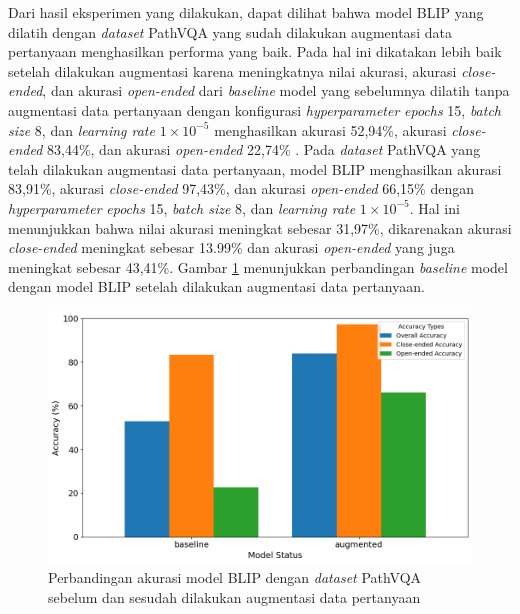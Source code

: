 \par Dari hasil eksperimen yang dilakukan, dapat dilihat bahwa model BLIP yang dilatih dengan \textit{dataset} PathVQA yang sudah dilakukan augmentasi data pertanyaan menghasilkan performa yang baik. Pada hal ini dikatakan lebih baik setelah dilakukan augmentasi karena meningkatnya nilai akurasi, akurasi \textit{close-ended}, dan akurasi \textit{open-ended} dari \textit{baseline} model yang sebelumnya dilatih tanpa augmentasi data pertanyaan dengan konfigurasi \textit{hyperparameter} \textit{epochs} 15, \textit{batch size} 8, dan \textit{learning rate} $1 \times 10^{-5}$ menghasilkan akurasi 52,94\%, akurasi \textit{close-ended} 83,44\%, dan akurasi \textit{open-ended} 22,74\% . Pada \textit{dataset} PathVQA yang telah dilakukan augmentasi data pertanyaan, model BLIP menghasilkan akurasi 83,91\%, akurasi \textit{close-ended} 97,43\%, dan akurasi \textit{open-ended} 66,15\% dengan \textit{hyperparameter} \textit{epochs} 15, \textit{batch size} 8, dan \textit{learning rate} $1 \times 10^{-5}$. Hal ini menunjukkan bahwa nilai akurasi meningkat sebesar 31,97\%, dikarenakan akurasi \textit{close-ended} meningkat sebesar 13.99\% dan akurasi \textit{open-ended} yang juga meningkat sebesar 43,41\%. Gambar \ref{fig:perbandingan-akurasi-blip-pathvqa} menunjukkan perbandingan \textit{baseline} model dengan model BLIP setelah dilakukan augmentasi data pertanyaan.

\begin{figure}[H]
  \centering
  \includegraphics[width=\textwidth]{image/bab4/blip-pathvqa.png}
  \caption{Perbandingan akurasi model BLIP dengan \textit{dataset} PathVQA sebelum dan sesudah dilakukan augmentasi data pertanyaan}
  \label{fig:perbandingan-akurasi-blip-pathvqa}
\end{figure}

